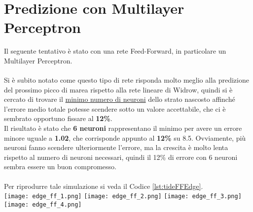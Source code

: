 	\section{Predizione con Multilayer Perceptron}
		Il seguente tentativo è stato con una rete Feed-Forward, in particolare un Multilayer Perceptron.\\
		\\
		Si è subito notato come questo tipo di rete risponda molto meglio alla predizione del prossimo picco di marea rispetto alla rete lineare di Widrow, quindi si è cercato di trovare il \underline{minimo numero di neuroni} dello strato nascosto affinché l'errore medio totale potesse scendere sotto un valore accettabile, che ci è sembrato opportuno fissare al \textbf{12\%}.\\
		Il risultato è stato che \textbf{6 neuroni} rappresentano il minimo per avere un errore minore uguale a \textbf{1.02}, che corrisponde appunto al \textbf{12\%} su 8.5. Ovviamente, più neuroni fanno scendere ulteriormente l'errore, ma la crescita è molto lenta rispetto al numero di neuroni necessari, quindi il 12\% di errore con 6 neuroni sembra essere un buon compromesso.\\
		\\
		Per riprodurre tale simulazione si veda il Codice \ref{lst:tideFFEdge}.\\
		\texttt{[image: edge\_ff\_1.png]}
		\texttt{[image: edge\_ff\_2.png]}
		\texttt{[image: edge\_ff\_3.png]}
		\texttt{[image: edge\_ff\_4.png]}
		\FloatBarrier